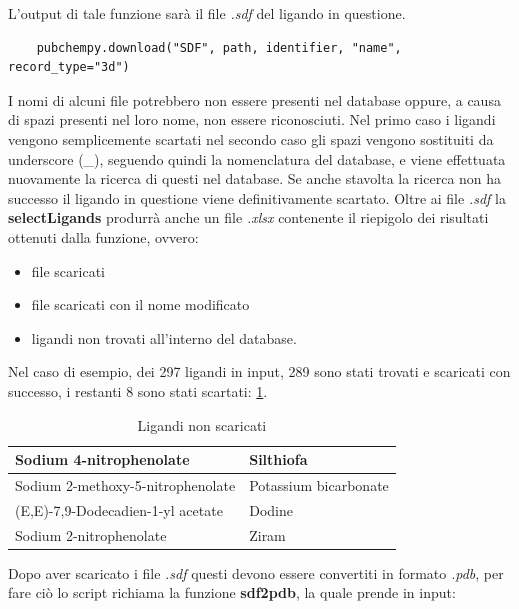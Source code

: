 L'output di tale funzione sarà il file \textit{.sdf} del ligando in questione.

\begin{verbatim}
    pubchempy.download("SDF", path, identifier, "name", record_type="3d")
\end{verbatim}

I nomi di alcuni file potrebbero non essere presenti nel database oppure, a causa di spazi presenti nel loro nome, non essere riconosciuti. Nel primo caso i ligandi vengono semplicemente scartati nel secondo caso gli spazi vengono sostituiti da underscore (\_), seguendo quindi la nomenclatura del database, e viene effettuata nuovamente la ricerca di questi nel database. Se anche stavolta la ricerca non ha successo il ligando in questione viene definitivamente scartato.\newline
Oltre ai file \textit{.sdf} la \textbf{selectLigands} produrrà anche un file \textit{.xlsx} contenente il riepigolo dei risultati ottenuti dalla funzione, ovvero:

\begin{itemize}
    \item file scaricati
    \item file scaricati con il nome modificato 
    \item ligandi non trovati all'interno del database.
\end{itemize}

Nel caso di esempio, dei 297 ligandi in input, 289 sono stati trovati e scaricati con successo, i restanti 8 sono stati scartati: \ref{tab:Ligandi scartati}.

\begin{table}[H]
    \centering
    \begin{tabular}{|l|l|}
    \hline
    Sodium 4-nitrophenolate & Silthiofa \\ \hline
    Sodium 2-methoxy-5-nitrophenolate & Potassium bicarbonate \\ \hline
    (E,E)-7,9-Dodecadien-1-yl acetate & Dodine \\ \hline
    Sodium 2-nitrophenolate & Ziram \\ \hline
    \end{tabular}
    \caption{Ligandi non scaricati}
    \label{tab:Ligandi scartati}
\end{table}

Dopo aver scaricato i file \textit{.sdf} questi devono essere convertiti in formato \textit{.pdb}, per fare ciò lo script richiama la funzione \textbf{sdf2pdb}, la quale prende in input:

